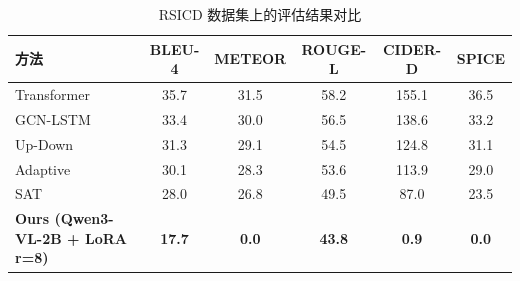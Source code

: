 
\begin{table}[htbp]
  \centering
  \caption{RSICD 数据集上的评估结果对比}
  \label{tab:benchmark_rsicd}
  \begin{tabular}{lccccc}
    \toprule
    方法 & BLEU-4 & METEOR & ROUGE-L & CIDER-D & SPICE \\
    \midrule
    Transformer &     35.7 &     31.5 &     58.2 &     155.1 &     36.5 \\
    GCN-LSTM &     33.4 &     30.0 &     56.5 &     138.6 &     33.2 \\
    Up-Down &     31.3 &     29.1 &     54.5 &     124.8 &     31.1 \\
    Adaptive &     30.1 &     28.3 &     53.6 &     113.9 &     29.0 \\
    SAT &     28.0 &     26.8 &     49.5 &     87.0 &     23.5 \\
    \textbf{Ours (Qwen3-VL-2B + LoRA r=8)} &     \textbf{17.7} &     \textbf{0.0} &     \textbf{43.8} &     \textbf{0.9} &     \textbf{0.0} \\
    \bottomrule
  \end{tabular}
\end{table}
